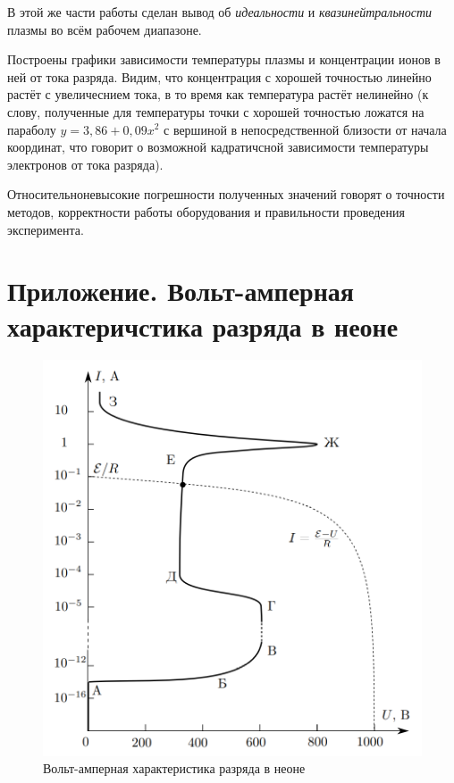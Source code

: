 \documentclass[a4paper,10pt]{article}
\begin{document}
В этой же части работы сделан вывод об \textit{идеальности} и \textit{квазинейтральности} плазмы во всём рабочем диапазоне.

Построены графики зависимости температуры плазмы и концентрации ионов в ней от тока разряда. Видим, что концентрация с хорошей точностью линейно растёт с увеличеснием тока, в то время как температура растёт нелинейно (к слову, полученные для температуры точки с хорошей точностью ложатся на параболу $y=3,86+0,09x^2$ с вершиной в непосредственной близости от начала координат, что говорит о возможной кадратичсной зависимости температуры электронов от тока разряда).

Относительноневысокие погрешности полученных значений говорят о точности методов, корректности работы оборудования и правильности проведения эксперимента.

\section{Приложение. Вольт-амперная характеричстика разряда в неоне}

\begin{figure}[h]
	\centering
	\includegraphics[scale=0.45]{Characteristic}
	\caption{Вольт-амперная характеристика разряда в неоне} \label{Characteristic}
\end{figure}
\end{document}
